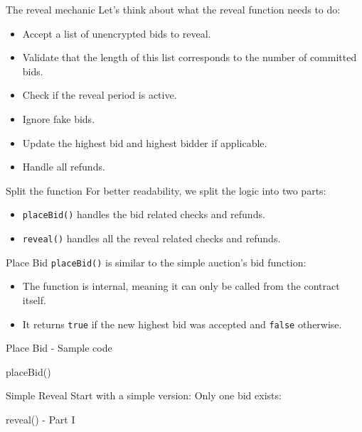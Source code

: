 \documentclass[]{beamer}
\begin{document}
\begin{frame}{The reveal mechanic}
	Let's think about what the reveal function needs to do:
	\begin{itemize}
		\item<2-> Accept a list of unencrypted bids to reveal.
		\item<3-> Validate that the length of this list corresponds to the number of committed bids.
		\item<4-> Check if the reveal period is active.
		\item<5-> Ignore fake bids.
		\item<6-> Update the highest bid and highest bidder if applicable.
		\item<7-> Handle all refunds.
	\end{itemize}
\end{frame}

\begin{frame}{Split the function}
For better readability, we split the logic into two parts:
	\begin{itemize}
		\item<2-> \texttt{placeBid()} handles the bid related checks and refunds.
		\item<3-> \texttt{reveal()} handles all the reveal related checks and refunds.
	\end{itemize}
\end{frame}

\begin{frame}{Place Bid}
\texttt{placeBid()} is similar to the simple auction's bid function:
	\begin{itemize}
		\item<2-> The function is internal, meaning it can only be called from the contract itself.
		\item<3-> It returns \texttt{true} if the new highest bid was accepted and \texttt{false} otherwise.
	\end{itemize} 	
\end{frame}

\begin{frame}{Place Bid - Sample code}
	\begin{samplecode}{placeBid()}
		
	\end{samplecode}
\end{frame}
\begin{frame}{Simple Reveal}
Start with a simple version: Only one bid exists:
\vspace{.3cm}
	\begin{samplecode}{reveal() - Part I}
		
	\end{samplecode}
\end{frame}
\end{document}
